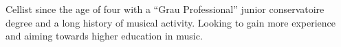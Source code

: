Cellist since the age of four with a ``Grau Professional'' junior conservatoire degree and a long history of musical activity.
Looking to gain more experience and aiming towards higher education in music.

